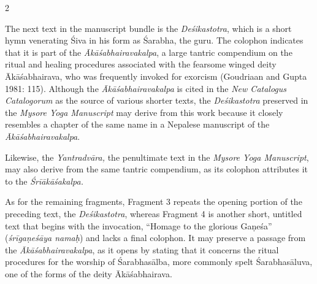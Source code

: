 \begin{nohyp}
\begin{multicols*}{2}
\begin{eng}
The next text in the manuscript bundle is the \emph{Deśikastotra}, which is a short hymn venerating Śiva in his form as Śarabha, the guru. The colophon indicates that it is part of the \emph{Ākāśabhairavakalpa}, a large tantric compendium on the ritual and healing procedures associated with the fearsome winged deity Ākāśabhairava, who was frequently invoked for exorcism (Goudriaan and Gupta 1981: 115). Although the \emph{Ākāśabhairavakalpa} is cited in the \emph{New Catalogus Catalogorum} as the source of various shorter texts, the \emph{Deśikastotra} preserved in the \emph{Mysore Yoga Manuscript} may derive from this work because it closely resembles a chapter of the same name in a Nepalese manuscript of the \emph{Ākāśabhairavakalpa}.

Likewise, the \emph{Yantradvāra,} the penultimate text in the \emph{Mysore Yoga Manuscript}, may also derive from the same tantric compendium, as its colophon attributes it to the \emph{Śrīākāśakalpa.}

As for the remaining fragments, Fragment 3 repeats the opening portion of the preceding text, the \emph{Deśikastotra}, whereas Fragment 4 is another short, untitled text that begins with the invocation, ``Homage to the glorious Gaṇeśa'' (\emph{śrīgaṇeśāya namaḥ}) and lacks a final colophon. It may preserve a passage from the \emph{Ākāśabhairavakalpa}, as it opens by stating that it concerns the ritual procedures for the worship of Śarabhasālba, more commonly spelt Śarabhasāluva, one of the forms of the deity Ākāśabhairava.


\end{eng}
\end{multicols*}
\end{nohyp}
